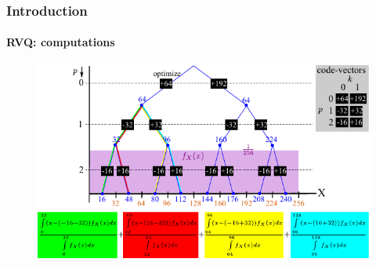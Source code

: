 \begin{frame}[plain]
\frametitle{Introduction}
\framesubtitle{RVQ: computations}
\logoCSIPCPL\mypagenum
	\begin{changemargin}{-1.3in}{0in}
		\begin{figure}				
			\includegraphics[width=1.0\textwidth]{figs/RVQ_stagewise_example2.pdf}
			\label{fig:RVQ_SQ_DMSE}
		\end{figure}
	\end{changemargin}
\end{frame}

